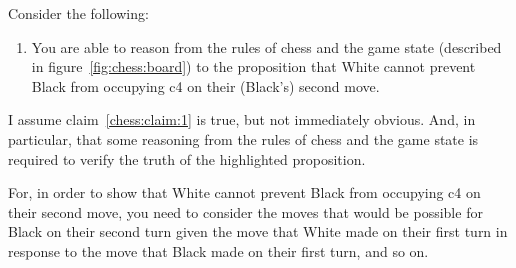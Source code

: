 \documentclass[10pt]{article}
\begin{document}
Consider the following:
\begin{enumerate}
\item\label{chess:claim:1} You are able to reason from the rules of chess and the game state (described in figure~\ref{fig:chess:board}) to the proposition that White cannot prevent Black from occupying c4 on their (Black's) second move.
\end{enumerate}
I assume claim~\ref{chess:claim:1} is true, but not immediately obvious.
And, in particular, that some reasoning from the rules of chess and the game state is required to verify the truth of the highlighted proposition.

For, in order to show that White cannot prevent Black from occupying c4 on their second move, you need to consider the moves that would be possible for Black on their second turn given the move that White made on their first turn in response to the move that Black made on their first turn, and so on.
\end{document}
